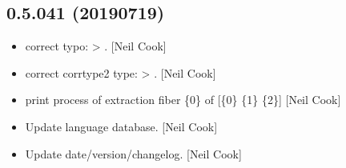 \documentclass[a4paper,10pt,english]{report}
\begin{document}
\subsection{0.5.041 (2019\sphinxhyphen{}07\sphinxhyphen{}19)}
\label{\detokenize{misc/changelog:id119}}\begin{itemize}
\item {} 
 \sphinxhyphen{} correct typo:  \textendash{}\textgreater{} .
{[}Neil Cook{]}

\item {} 
 \sphinxhyphen{} correct corrtype2 type:
 \textendash{}\textgreater{} . {[}Neil Cook{]}

\item {} 
 \sphinxhyphen{} print process of extraction fiber \{0\} of {[}\{0\}
\{1\} \{2\}{]} {[}Neil Cook{]}

\item {} 
Update language database. {[}Neil Cook{]}

\item {} 
Update date/version/changelog. {[}Neil Cook{]}

\end{itemize}
\end{document}
